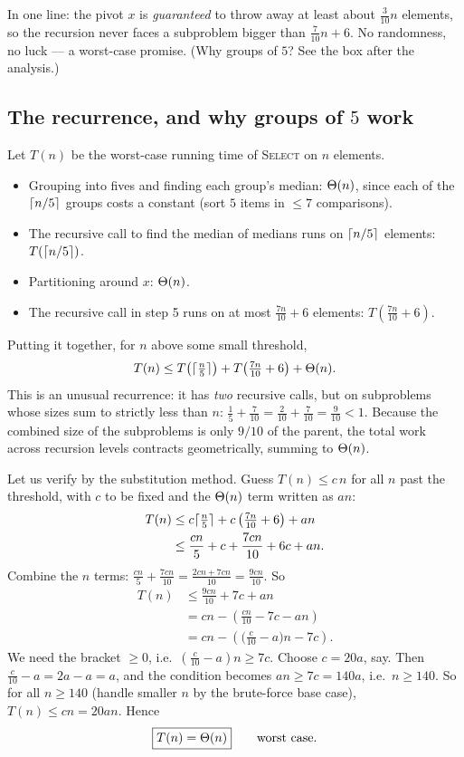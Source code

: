 \begin{focusbox}
In one line: the pivot $x$ is \emph{guaranteed} to throw away at least
about $\tfrac{3}{10}n$ elements, so the recursion never faces a subproblem bigger
than $\tfrac{7}{10}n + 6$. No randomness, no luck --- a worst-case promise. (Why
groups of $5$? See the box after the analysis.)
\end{focusbox}

\subsection{The recurrence, and why groups of $5$ work}

Let $T(n)$ be the worst-case running time of \textsc{Select}
on $n$ elements.
\begin{itemize}
  \item Grouping into fives and finding each group's median: $\Theta(n)$, since each of
    the $\lceil n/5\rceil$ groups costs a constant (sort $5$ items in $\le 7$
    comparisons).
  \item The recursive call to find the median of medians runs on $\lceil n/5\rceil$
    elements: $T(\lceil n/5\rceil)$.
  \item Partitioning around $x$: $\Theta(n)$.
  \item The recursive call in step 5 runs on at most $\tfrac{7n}{10} + 6$ elements:
    $T(\tfrac{7n}{10}+6)$.
\end{itemize}
Putting it together, for $n$ above some small threshold,
\[
T(n) \le T\!\left(\lceil\tfrac{n}{5}\rceil\right) + T\!\left(\tfrac{7n}{10} + 6\right) + \Theta(n).
\]
This is an unusual recurrence: it has \emph{two} recursive calls, but on
subproblems whose sizes sum to strictly less than $n$: $\tfrac{1}{5} + \tfrac{7}{10} = \tfrac{2}{10} + \tfrac{7}{10} = \tfrac{9}{10} < 1$.
Because the combined size of the subproblems is only $9/10$ of the parent, the
total work across recursion levels contracts geometrically, summing to $\Theta(n)$.

Let us verify by the substitution method. Guess $T(n) \le c\,n$ for all $n$ past
the threshold, with $c$ to be fixed and the $\Theta(n)$ term written as $a n$:
\begin{align*}
  T(n) &\le c\lceil\tfrac{n}{5}\rceil + c\left(\tfrac{7n}{10}+6\right) + a n \\
       &\le \frac{cn}{5} + c + \frac{7cn}{10} + 6c + a n.
\end{align*}
Combine the $n$ terms: $\tfrac{cn}{5} + \tfrac{7cn}{10} = \tfrac{2cn + 7cn}{10} = \tfrac{9cn}{10}$.
So
\begin{align*}
  T(n) &\le \frac{9cn}{10} + 7c + a n \\
       &= cn - \left(\frac{cn}{10} - 7c - a n\right) \\
       &= cn - \left(\Big(\tfrac{c}{10} - a\Big)n - 7c\right).
\end{align*}
We need the bracket $\ge 0$, i.e.\ $(\tfrac{c}{10} - a)n \ge 7c$. Choose
$c = 20a$, say. Then $\tfrac{c}{10} - a = 2a - a = a$, and the condition becomes
$a n \ge 7c = 140 a$, i.e.\ $n \ge 140$. So for all $n \ge 140$ (handle smaller $n$
by the brute-force base case), $T(n) \le cn = 20an$. Hence
\[
\boxed{T(n) = \Theta(n)} \qquad \text{worst case.}
\]

